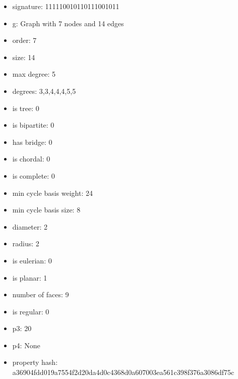 \begin{itemize}
\item signature: 111110010110111001011
\item g: Graph with 7 nodes and 14 edges
\item order: 7
\item size: 14
\item max degree: 5
\item degrees: 3,3,4,4,4,5,5
\item is tree: 0
\item is bipartite: 0
\item has bridge: 0
\item is chordal: 0
\item is complete: 0
\item min cycle basis weight: 24
\item min cycle basis size: 8
\item diameter: 2
\item radius: 2
\item is eulerian: 0
\item is planar: 1
\item number of faces: 9
\item is regular: 0
\item p3: 20
\item p4: None
\item property hash: a36904fdd019a7554f2d20da4d0c4368d0a607003ea561c398f376a3086df75c
\end{itemize}
\newpage
\begin{figure}
\end{figure}

